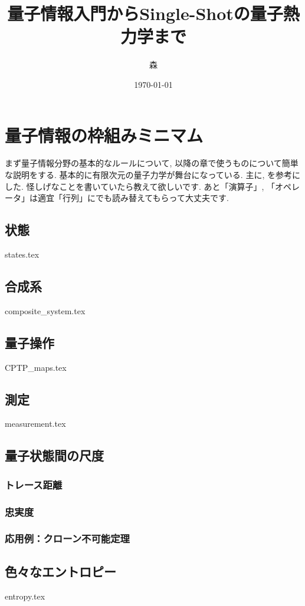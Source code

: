 \documentclass[report]{jlreq}
\title{量子情報入門からSingle-Shotの量子熱力学まで}
\author{森}
\date{\today}
\begin{document}
\maketitle

\setcounter{tocdepth}{1}
\thispagestyle{TOC}
\tableofcontents


\pagestyle{mystyle}
\chapter{量子情報の枠組みミニマム}
まず量子情報分野の基本的なルールについて, 以降の章で使うものについて簡単な説明をする. 
基本的に有限次元の量子力学が舞台になっている. 
主に\cite{nielsen2010quantum}, \cite{SagawaEntropy}を参考にした. 
怪しげなことを書いていたら教えて欲しいです. 
あと「演算子」, 「オペレータ」は適宜「行列」にでも読み替えてもらって大丈夫です. 
\section{状態}
{states.tex}
\section{合成系}
{composite_system.tex}
\section{量子操作}
{CPTP_maps.tex}
\section{測定}
{measurement.tex}
\section{量子状態間の尺度}
\subsection{トレース距離}
\subsection{忠実度}
\subsection{応用例：クローン不可能定理}
\section{色々なエントロピー}
{entropy.tex}
\end{document}
